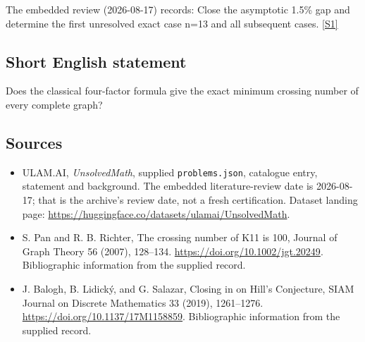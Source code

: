 \documentclass[11pt,a4paper]{article}
\newcommand{\sref}[2]{\hyperlink{source:#1:#2}{[S#2]}}
\begin{document}
The embedded review (2026-08-17) records: Close the asymptotic 1.5\% gap and determine the first unresolved exact case n=13 and all subsequent cases. \sref{statement}{1}

\subsection{Short English statement}

Does the classical four-factor formula give the exact minimum crossing number of every complete graph?

\subsection{Sources}

{\small

\begin{itemize}

\item[\hypertarget{source:statement:1}{S1}] ULAM.AI, \emph{UnsolvedMath}, supplied \texttt{problems.json}, catalogue entry, statement and background. The embedded literature-review date is 2026-08-17; that is the archive’s review date, not a fresh certification. Dataset landing page: \url{https://huggingface.co/datasets/ulamai/UnsolvedMath}.

\item[\hypertarget{source:statement:2}{S2}] S. Pan and R. B. Richter, The crossing number of K11 is 100, Journal of Graph Theory 56 (2007), 128–134. \url{https://doi.org/10.1002/jgt.20249}. Bibliographic information from the supplied record.

\item[\hypertarget{source:statement:3}{S3}] J. Balogh, B. Lidický, and G. Salazar, Closing in on Hill's Conjecture, SIAM Journal on Discrete Mathematics 33 (2019), 1261–1276. \url{https://doi.org/10.1137/17M1158859}. Bibliographic information from the supplied record.

\end{itemize}

}

\label{end:statement}
\end{document}
